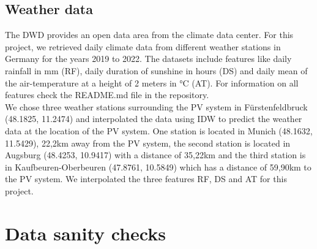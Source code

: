 \documentclass{article}
\begin{document}
\subsection{Weather data}
The DWD provides an open data area from the climate data center. For this project, we retrieved daily climate data from different weather stations in Germany for the years 2019 to 2022. The datasets include features like daily rainfall in mm (RF), daily duration of sunshine in hours (DS) and daily mean of the air-temperature at a height of 2 meters in °C (AT). For information on all features check the README.md file in the repository. \\ We chose three weather stations surrounding the PV system in Fürstenfeldbruck (48.1825, 11.2474) and interpolated the data using IDW to predict the weather data at the location of the PV system. One station is located in Munich (48.1632, 11.5429), 22,2km away from the PV system, the second station is located in Augsburg (48.4253, 10.9417) with a distance of 35,22km and the third station is in Kaufbeuren-Oberbeuren (47.8761, 10.5849) which has a distance of 59,90km to the PV system. We interpolated the three features RF, DS and AT for this project.
\section{Data sanity checks}\label{sec:methods}


% 
\end{document}
